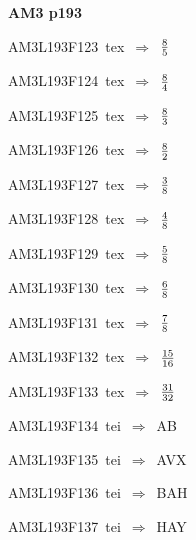 \par\vfill\eject
{\bf\hfill AM3 p193\hfill\hbox{}}\par\bigskip
{\sixrm AM3L193F123\ {\sixit tex}\ }$\Rightarrow$\ ${8\over 5}$\par\smallskip
{\sixrm AM3L193F124\ {\sixit tex}\ }$\Rightarrow$\ ${8\over 4}$\par\smallskip
{\sixrm AM3L193F125\ {\sixit tex}\ }$\Rightarrow$\ ${8\over 3}$\par\smallskip
{\sixrm AM3L193F126\ {\sixit tex}\ }$\Rightarrow$\ ${8\over 2}$\par\smallskip
{\sixrm AM3L193F127\ {\sixit tex}\ }$\Rightarrow$\ ${3\over 8}$\par\smallskip
{\sixrm AM3L193F128\ {\sixit tex}\ }$\Rightarrow$\ ${4\over 8}$\par\smallskip
{\sixrm AM3L193F129\ {\sixit tex}\ }$\Rightarrow$\ ${5\over 8}$\par\smallskip
{\sixrm AM3L193F130\ {\sixit tex}\ }$\Rightarrow$\ ${6\over 8}$\par\smallskip
{\sixrm AM3L193F131\ {\sixit tex}\ }$\Rightarrow$\ ${7\over 8}$\par\smallskip
{\sixrm AM3L193F132\ {\sixit tex}\ }$\Rightarrow$\ ${15\over 16}$\par\smallskip
{\sixrm AM3L193F133\ {\sixit tex}\ }$\Rightarrow$\ ${31\over 32}$\par\smallskip
{\sixrm AM3L193F134\ {\sixit tei}\ }$\Rightarrow$\ AB\par\smallskip
{\sixrm AM3L193F135\ {\sixit tei}\ }$\Rightarrow$\ AVX\par\smallskip
{\sixrm AM3L193F136\ {\sixit tei}\ }$\Rightarrow$\ BAH\par\smallskip
{\sixrm AM3L193F137\ {\sixit tei}\ }$\Rightarrow$\ HAY\par\smallskip

